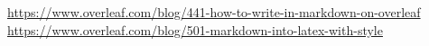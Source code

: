 \markdownRendererUlBeginTight
\markdownRendererUlItem \url{https://www.overleaf.com/blog/441-how-to-write-in-markdown-on-overleaf}\markdownRendererUlItemEnd 
\markdownRendererUlItem \url{https://www.overleaf.com/blog/501-markdown-into-latex-with-style}\markdownRendererUlItemEnd 
\markdownRendererUlEndTight \relax